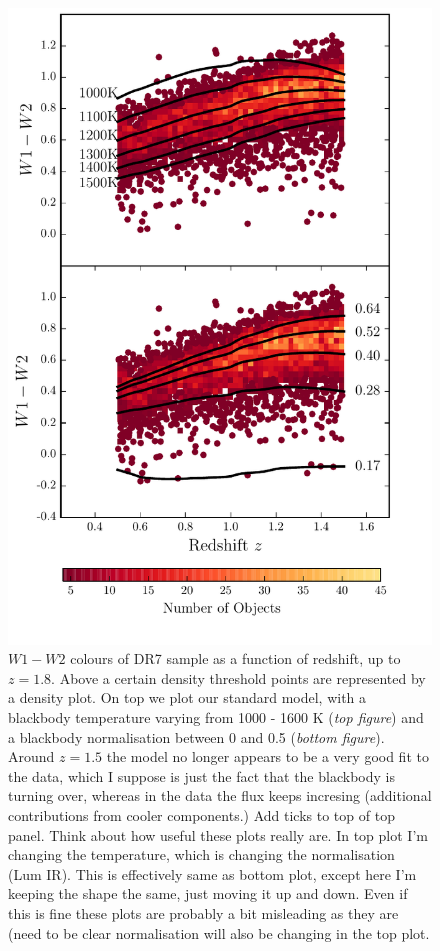 \begin{figure}
\centering
\includegraphics[width=\columnwidth]{figures/chapter06/w1w2_versus_redshift.pdf}
\caption{$W1 - W2$ colours of DR7 sample as a function of redshift, up to $z=1.8$. Above a certain density threshold points are represented by a density plot. On top we plot our standard model, with a blackbody temperature varying from 1000 - 1600 K ({\it top figure}) and a blackbody normalisation between 0 and 0.5 ({\it bottom figure}). Around $z=1.5$ the model no longer appears to be a very good fit to the data, which I suppose is just the fact that the blackbody is turning over, whereas in the data the flux keeps incresing (additional contributions from cooler components.) Add ticks to top of top panel. Think about how useful these plots really are. In top plot I'm changing the temperature, which is changing the normalisation (Lum IR). This is effectively same as bottom plot, except here I'm keeping the shape the same, just moving it up and down. Even if this is fine these plots are probably a bit misleading as they are (need to be clear normalisation will also be changing in the top plot.}
  \label{fig:w1w2colors}
\end{figure}

